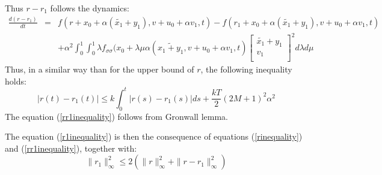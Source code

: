 \documentclass[a4paper,10pt]{article}
\begin{document}
Thus $r-r_{1}$ follows the dynamics:
 \begin{eqnarray*}
       \frac{d(r-r_{1})}{dt}  & = & f(r+x_{0}+ \alpha ( \tilde{x_{1}} + y_{1}), v + u_{0} + \alpha v_{1}, t)
                    - f(r_{1}+x_{0}+ \alpha ( \tilde{x_{1}} + y_{1}), v + u_{0} + \alpha v_{1}, t) 
        \\
         &  & + \alpha^{2} \int_{0}^{1} \int_{0}^{1}
		   \lambda f_{\sigma \sigma}(x_{0}+\lambda\mu\alpha(\tilde{x_{1}+y_{1}},
		       v + u_{0} + \alpha v_{1},t)
		       \left[
		       \begin{array}
		       {c}
		           
		           \tilde{x_{1}} + y_{1}  \\
		           
		           v_{1}  \\
		        
		       \end{array}
		       \right]^{2} d \lambda d \mu
    \end{eqnarray*}
    Thus, in a similar way than for the upper bound of $r$, the 
    following inequality holds:
    \[
               |r(t)-r_{1}(t)| \leq k\int_{0}^{t} |r(s)-r_{1}(s)|ds + 
       \frac{kT}{2}(2M+1)^{2} \alpha^{2}
    \]
    The equation (\ref{rr1inequality}) follows from Gronwall lemma.
    
    The equation (\ref{r1inequality}) is then the consequence of 
    equations (\ref{rinequality}) and (\ref{rr1inequality}), together 
    with:
    \[
      \|r_{1}\|_{\infty}^{2} \leq  2 (\|r\|_{\infty}^{2} + 
      \|r-r_{1}\|_{\infty}^{2})
    \]
    
\end{document}
